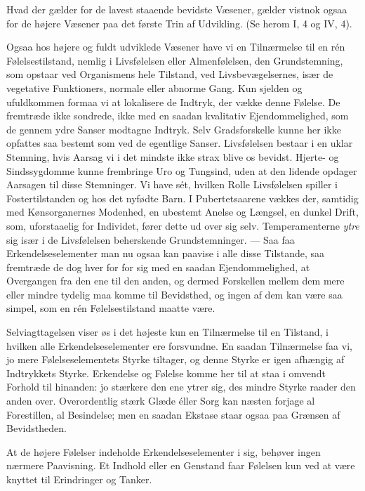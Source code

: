 \documentclass[12pt,a4paper,openany]{book}
\newcommand{\opage}[1]{\marginnote{\footnotesize\textit{[#1]}}}
\begin{document}
Hvad der gælder for de lavest staaende bevidste Væsener, gælder vistnok
ogsaa for de højere Væsener paa det første Trin af Udvikling. (Se herom
I, 4 og IV, 4).

Ogsaa hos højere og fuldt udviklede Væsener have vi en Tilnærmelse til
en rén Følelsestilstand, nemlig i Livsfølelsen eller Almenfølelsen, den
Grundstemning, som opstaar ved Organismens hele Tilstand, ved
Livsbevægelsernes, især de
\opage{116}vegetative Funktioners, normale eller abnorme Gang. Kun
sjelden og ufuldkommen formaa vi at lokalisere de Indtryk, der vække
denne Følelse. De fremtræde ikke sondrede, ikke med en saadan kvalitativ
Ejendommelighed, som de gennem ydre Sanser modtagne Indtryk. Selv
Gradsforskelle kunne her ikke opfattes saa bestemt som ved de egentlige
Sanser. Livsfølelsen bestaar i en uklar Stemning, hvis Aarsag vi i det
mindste ikke strax blive os bevidst. Hjerte- og Sindssygdomme kunne
frembringe Uro og Tungsind, uden at den lidende opdager Aarsagen til
disse Stemninger. Vi have sét, hvilken Rolle Livsfølelsen spiller i
Fostertilstanden og hos det nyfødte Barn. I Pubertetsaarene vækkes der,
samtidig med Kønsorganernes Modenhed, en ubestemt Anelse og Længsel, en
dunkel Drift, som, uforstaaelig for Individet, fører dette ud over sig
selv. Temperamenterne \emph{ytre} sig især i de Livsfølelsen beherskende
Grundstemninger. --- Saa faa Erkendelseselementer man nu ogsaa kan
paavise i alle disse Tilstande, saa fremtræde de dog hver for for sig
med en saadan Ejendommelighed, at Overgangen fra den ene til den anden,
og dermed Forskellen mellem dem mere eller mindre tydelig maa komme til
Bevidsthed, og ingen af dem kan være saa simpel, som en rén
Følelsestilstand maatte være.

Selviagttagelsen viser øs i det højeste kun en Tilnærmelse til en
Tilstand, i hvilken alle Erkendelseselementer ere forsvundne. En saadan
Tilnærmelse faa vi, jo mere Følelseselementets Styrke tiltager, og denne
Styrke er igen afhængig af Indtrykkets Styrke. Erkendelse og Følelse
komme her til at staa i omvendt Forhold til hinanden: jo stærkere den
ene ytrer sig, des mindre Styrke raader den anden over. Overordentlig
stærk Glæde éller Sorg kan næsten forjage al Forestillen, al Besindelse;
men en saadan Ekstase staar ogsaa paa Grænsen af Bevidstheden.

At de højere Følelser indeholde Erkendelseselementer i sig, behøver
ingen nærmere Paavisning. Et Indhold eller en Genstand faar Følelsen kun
ved at være knyttet til Erindringer og Tanker.
\end{document}

